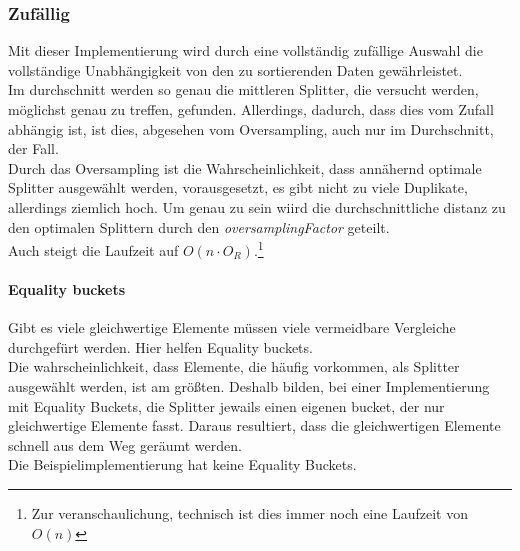 		\subsubsection{Zufällig}
			\label{sec:random}
			
			Mit dieser Implementierung wird durch eine vollständig zufällige Auswahl die vollständige Unabhängigkeit von den zu sortierenden Daten gewährleistet.\\
			Im durchschnitt werden so genau die mittleren Splitter, die versucht werden, möglichst genau zu treffen, gefunden.
			Allerdings, dadurch, dass dies vom Zufall abhängig ist, ist dies, abgesehen vom Oversampling, auch nur im Durchschnitt, der Fall.\\
			Durch das Oversampling ist die Wahrscheinlichkeit, dass annähernd optimale Splitter ausgewählt werden, vorausgesetzt, es gibt nicht zu viele Duplikate, allerdings ziemlich hoch.
			Um genau zu sein wiird die durchschnittliche distanz zu den optimalen Splittern durch den \textit{oversamplingFactor} geteilt.\\
			Auch steigt die Laufzeit auf $O(n\cdot O_R)$.\footnote{Zur veranschaulichung, technisch ist dies immer noch eine Laufzeit von $O(n)$}

			\paragraph{Equality buckets}
				Gibt es viele gleichwertige Elemente müssen viele vermeidbare Vergleiche durchgefürt werden.
				Hier helfen Equality buckets.\\
				Die wahrscheinlichkeit, dass Elemente, die häufig vorkommen, als Splitter ausgewählt werden, ist am größten.
				Deshalb bilden, bei einer Implementierung mit Equality Buckets, die Splitter jewails einen eigenen bucket, der nur gleichwertige Elemente fasst.
				Daraus resultiert, dass die gleichwertigen Elemente schnell aus dem Weg geräumt werden.\\
				Die Beispielimplementierung hat keine Equality Buckets.

